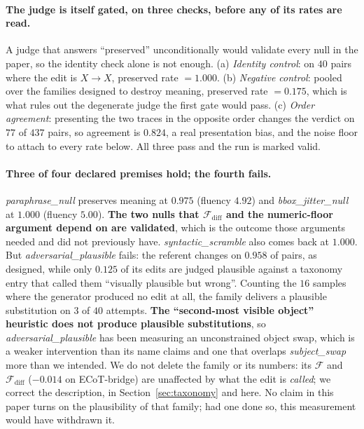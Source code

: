 \documentclass{article}
\begin{document}
\paragraph{The judge is itself gated, on three checks, before any of its rates are read.} A judge that answers ``preserved'' unconditionally would validate every null in the paper, so the identity check alone is not enough. (a) \emph{Identity control}: on $40$ pairs where the edit is $X \to X$, preserved rate $= \mathbf{1.000}$. (b) \emph{Negative control}: pooled over the families designed to destroy meaning, preserved rate $= \mathbf{0.175}$, which is what rules out the degenerate judge the first gate would pass. (c) \emph{Order agreement}: presenting the two traces in the opposite order changes the verdict on $77$ of $437$ pairs, so agreement is $\mathbf{0.824}$, a real presentation bias, and the noise floor to attach to every rate below. All three pass and the run is marked valid.

\paragraph{Three of four declared premises hold; the fourth fails.} \emph{paraphrase\_null} preserves meaning at $0.975$ (fluency $4.92$) and \emph{bbox\_jitter\_null} at $1.000$ (fluency $5.00$). \textbf{The two nulls that $\mathcal{F}_{\text{diff}}$ and the numeric-floor argument depend on are validated}, which is the outcome those arguments needed and did not previously have. \emph{syntactic\_scramble} also comes back at $1.000$. But \emph{adversarial\_plausible} fails: the referent changes on $0.958$ of pairs, as designed, while only $\mathbf{0.125}$ of its edits are judged plausible against a taxonomy entry that called them ``visually plausible but wrong''. Counting the $16$ samples where the generator produced no edit at all, the family delivers a plausible substitution on $3$ of $40$ attempts. \textbf{The ``second-most visible object'' heuristic does not produce plausible substitutions}, so \emph{adversarial\_plausible} has been measuring an unconstrained object swap, which is a weaker intervention than its name claims and one that overlaps \emph{subject\_swap} more than we intended. We do not delete the family or its numbers: its $\mathcal{F}$ and $\mathcal{F}_{\text{diff}}$ ($-0.014$ on ECoT-bridge) are unaffected by what the edit is \emph{called}; we correct the description, in Section~\ref{sec:taxonomy} and here. No claim in this paper turns on the plausibility of that family; had one done so, this measurement would have withdrawn it.
\end{document}
